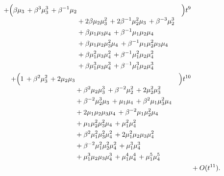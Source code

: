 \documentclass[10pt]{article}
\begin{document}
\[\begin{aligned}
  + \Bigl(\begin{aligned}[t]\beta\mu_3\,+\beta^{3}\mu_3^{3}\,+\beta^{-1}\mu_2 \\
  &{}+2\beta\mu_2\mu_3^{2}\,+2\beta^{-1}\mu_2^{2}\mu_3\,+\beta^{-3}\mu_2^{3} \\
  &{}+\beta\mu_1\mu_3\mu_4\,+\beta^{-1}\mu_1\mu_2\mu_4 \\
  &{}+\beta\mu_1\mu_2\mu_3^{2}\mu_4\,+\beta^{-1}\mu_1\mu_2^{2}\mu_3\mu_4 \\
  &{}+\beta\mu_1^{2}\mu_3\mu_4^{2}\,+\beta^{-1}\mu_1^{2}\mu_2\mu_4^{2} \\
  &{}+\beta\mu_1^{3}\mu_3\mu_4^{3}\,+\beta^{-1}\mu_1^{3}\mu_2\mu_4^{3}\end{aligned}\Bigr)t^{9} \\
  + \Bigl(\begin{aligned}[t]1\,+\beta^{2}\mu_3^{2}\,+2\mu_2\mu_3 \\
  &{}+\beta^{2}\mu_2\mu_3^{3}\,+\beta^{-2}\mu_2^{2}\,+2\mu_2^{2}\mu_3^{2} \\
  &{}+\beta^{-2}\mu_2^{3}\mu_3\,+\mu_1\mu_4\,+\beta^{2}\mu_1\mu_3^{2}\mu_4 \\
  &{}+2\mu_1\mu_2\mu_3\mu_4\,+\beta^{-2}\mu_1\mu_2^{2}\mu_4 \\
  &{}+\mu_1\mu_2^{2}\mu_3^{2}\mu_4\,+\mu_1^{2}\mu_4^{2} \\
  &{}+\beta^{2}\mu_1^{2}\mu_3^{2}\mu_4^{2}\,+2\mu_1^{2}\mu_2\mu_3\mu_4^{2} \\
  &{}+\beta^{-2}\mu_1^{2}\mu_2^{2}\mu_4^{2}\,+\mu_1^{3}\mu_4^{3} \\
  &{}+\mu_1^{3}\mu_2\mu_3\mu_4^{3}\,+\mu_1^{4}\mu_4^{4}\,+\mu_1^{5}\mu_4^{5}\end{aligned}\Bigr)t^{10} \\
  &+ O(t^{11}).
\end{aligned}
\]
\end{document}
